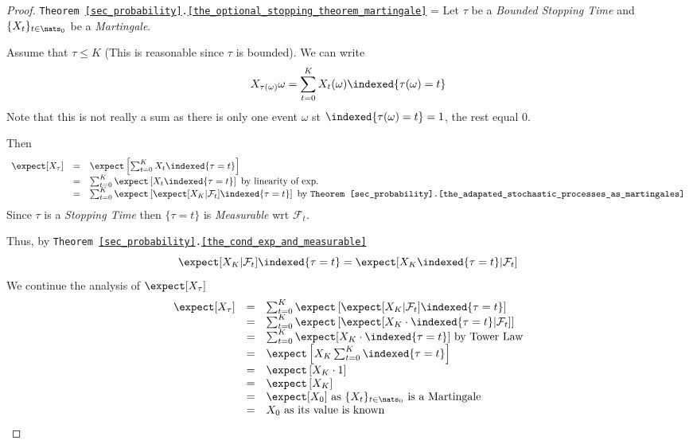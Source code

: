 \documentclass[11pt,a4paper]{article}
\begin{document}
  \begin{proof}{\texttt{Theorem \ref{sec_probability}.\ref{the_optional_stopping_theorem_martingale}}}
    \everymath={\displaystyle}
    Let $\tau$ be a \textit{Bounded Stopping Time} and $\{X_t\}_{t\in\nats_0}$ be a \textit{Martingale}.
    \par Assume that $\tau\leq K$ (This is reasonable since $\tau$ is bounded). We can write
    \[ X_{\tau(\omega)}{\omega}=\sum_{t=0}^KX_t(\omega)\indexed\{\tau(\omega)=t\} \]
    Note that this is not really a sum as there is only one event $\omega$ st $\indexed\{\tau(\omega)=t\}=1$, the rest equal 0.
    \par Then
    \[\begin{array}{rcl}
      \expect[X_\tau]&=&\expect\left[\sum_{t=0}^KX_t\indexed\{\tau=t\}\right]\\
      &=&\sum_{t=0}^K\expect\left[X_t\indexed\{\tau=t\}\right]\text{ by linearity of exp.}\\
      &=&\sum_{t=0}^K\expect\left[\expect[X_K|\mathcal{F}_t]\indexed\{\tau=t\}\right]\text{ by \texttt{Theorem \ref{sec_probability}.\ref{the_adapated_stochastic_processes_as_martingales}}}
    \end{array}\]
    Since $\tau$ is a \textit{Stopping Time} then $\{\tau=t\}$ is \textit{Measurable} wrt $\mathcal{F}_t$.
    \par Thus, by \texttt{Theorem \ref{sec_probability}.\ref{the_cond_exp_and_measurable}}
    \[ \expect[X_K|\mathcal{F}_t]\indexed\{\tau=t\}=\expect[X_K\indexed\{\tau=t\}|\mathcal{F}_t] \]
    We continue the analysis of $\expect[X_\tau]$
    \[\begin{array}{rcl}
    \expect[X_\tau]&=&\sum_{t=0}^K\expect\left[\expect[X_K|\mathcal{F}_t]\indexed\{\tau=t\}\right]\\
    &=&\sum_{t=0}^K\expect\left[\expect[X_K\cdot \indexed\{\tau=t\}|\mathcal{F}_t]\right]\\
    &=&\sum_{t=0}^K\expect[X_K\cdot \indexed\{\tau=t\}]\text{ by Tower Law}\\
    &=&\expect\left[X_K\sum_{t=0}^K\indexed\{\tau=t\}\right]\\
    &=&\expect\left[X_K\cdot1\right]\\
    &=&\expect\left[X_K\right]\\
    &=&\expect[X_0]\text{ as }\{X_t\}_{t\in\nats_0}\text{ is a Martingale}\\
    &=&X_0\text{ as its value is known}
    \end{array}\]
  \end{proof}
\end{document}
